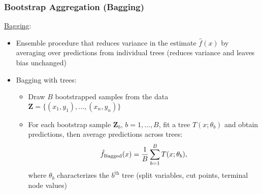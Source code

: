 \documentclass{beamer}
\begin{document}
\begin{frame}

    \frametitle{Bootstrap Aggregation (Bagging)}
    
    \underline{Bagging}:
    \medskip
    
    \begin{itemize}
        \item Ensemble procedure that reduces variance in the estimate 
              $\hat{f}(x)$ by averaging over predictions from individual
              trees (reduces variance and leaves bias unchanged)
        \medskip
        \item Bagging with trees:
            \begin{itemize}
            \small
                \item Draw $B$ bootstrapped samples from the data 
                      $\boldsymbol{Z} = \{(x_1,y_1), \dots, (x_n,y_n)\}$
                \item For each bootstrap sample $\boldsymbol{Z}_{b}$, 
                      $b = 1,\dots,B$, fit a tree $T(x; \theta_b)$ and obtain
                      predictions, then average predictions across trees:
                \begin{equation}
                \footnotesize
                    \hat{f}_\text{Bagged}(x) = 
                    \frac{1}{B} \sum_{b=1}^B T(x; \theta_b),
                \end{equation}
                where $\theta_b$ characterizes the $b^\text{th}$ tree (split
                variables, cut points, terminal node values)
            \end{itemize}
    \end{itemize}

\end{frame}


\end{document}
